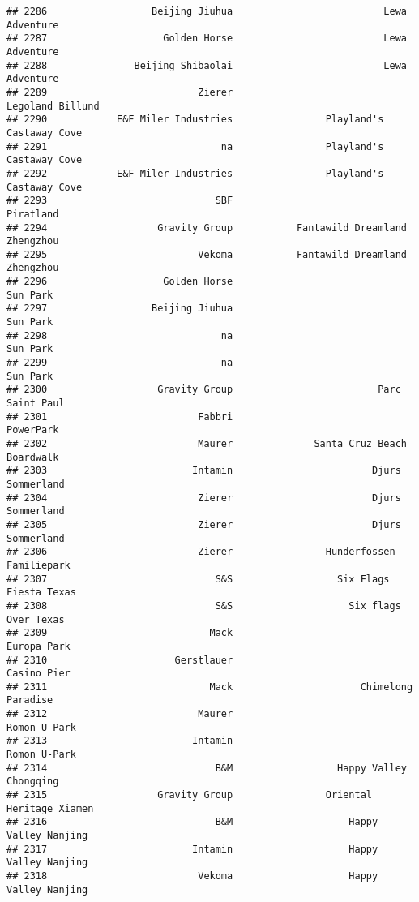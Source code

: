 \documentclass[
]{article}
\begin{document}
\begin{verbatim}
## 2286                  Beijing Jiuhua                          Lewa Adventure
## 2287                    Golden Horse                          Lewa Adventure
## 2288               Beijing Shibaolai                          Lewa Adventure
## 2289                          Zierer                        Legoland Billund
## 2290            E&F Miler Industries                Playland's Castaway Cove
## 2291                              na                Playland's Castaway Cove
## 2292            E&F Miler Industries                Playland's Castaway Cove
## 2293                             SBF                               Piratland
## 2294                   Gravity Group           Fantawild Dreamland Zhengzhou
## 2295                          Vekoma           Fantawild Dreamland Zhengzhou
## 2296                    Golden Horse                                Sun Park
## 2297                  Beijing Jiuhua                                Sun Park
## 2298                              na                                Sun Park
## 2299                              na                                Sun Park
## 2300                   Gravity Group                         Parc Saint Paul
## 2301                          Fabbri                               PowerPark
## 2302                          Maurer              Santa Cruz Beach Boardwalk
## 2303                         Intamin                        Djurs Sommerland
## 2304                          Zierer                        Djurs Sommerland
## 2305                          Zierer                        Djurs Sommerland
## 2306                          Zierer                Hunderfossen Familiepark
## 2307                             S&S                  Six Flags Fiesta Texas
## 2308                             S&S                    Six flags Over Texas
## 2309                            Mack                             Europa Park
## 2310                      Gerstlauer                             Casino Pier
## 2311                            Mack                      Chimelong Paradise
## 2312                          Maurer                            Romon U-Park
## 2313                         Intamin                            Romon U-Park
## 2314                             B&M                  Happy Valley Chongqing
## 2315                   Gravity Group                Oriental Heritage Xiamen
## 2316                             B&M                    Happy Valley Nanjing
## 2317                         Intamin                    Happy Valley Nanjing
## 2318                          Vekoma                    Happy Valley Nanjing

\end{verbatim}
\end{document}
